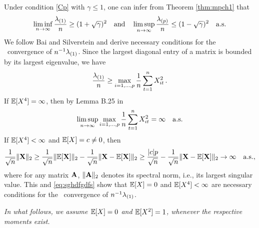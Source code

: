 Under condition \eqref{Cp} with $\gamma\le 1$, one can infer from Theorem \ref{thm:mpch1} that
\begin{equation}\label{eq:conlcu}
\liminf_{n\to \infty}\frac{\lambda_{(1)}}{n} \ge (1+\sqrt{\gamma})^2\quad \mbox{and}\quad
\limsup_{n\to \infty}\frac{\lambda_{(p)}}{n} \le (1-\sqrt{\gamma})^2\quad {\rm a.s.} 
\end{equation}
We follow Bai and Silverstein \cite{bai:silverstein:2010} and derive necessary conditions for the \as~convergence of $n^{-1}\lambda_{(1)}$. Since the largest diagonal entry of a matrix is bounded by its largest eigenvalue, we have
\begin{equation}\label{eq:simplebo}
\frac{\lambda_{(1)}}{n}\ge \max_{i=1,\ldots,p} \frac{1}{n} \sum_{t=1}^n X_{it}^2\,.
\end{equation}
If $\mathbb{E}[X^4]=\infty$, then by Lemma B.25 in \cite{bai:silverstein:2010}
\begin{equation}\label{eq:sghdfgdfs}
\limsup_{n\to \infty}\max_{i=1,\ldots,p} \frac{1}{n} \sum_{t=1}^n X_{it}^2 =\infty \quad {\rm a.s.}
\end{equation}
If $\mathbb{E}[X^4]<\infty$ and $\mathbb{E}[X]=c\neq 0$, then
\begin{equation*}
\frac{1}{\sqrt{n}}\|{\mathbf X}\|_2\ge \frac{1}{\sqrt{n}}\|\mathbb{E}[{\mathbf X}]\|_2  -\frac{1}{\sqrt{n}}\|{\mathbf X}-\mathbb{E}[{\mathbf X}]\|_2
\ge \frac{|c| p}{\sqrt{n}}  - \frac{1}{\sqrt{n}}\|{\mathbf X}-\mathbb{E}[{\mathbf X}]\|_2 \to\infty \quad {\rm a.s.},
\end{equation*}
where for any matrix ${\mathbf A}$, $\|{\mathbf A}\|_2$ denotes its spectral norm, i.e., its largest singular value. This and \eqref{eq:sghdfgdfs} show that $\mathbb{E}[X]=0$ and $\mathbb{E}[X^4]<\infty$ are necessary conditions for the \as~convergence of $n^{-1}\lambda_{(1)}$.

{\em In what follows, we assume $\mathbb{E}[X]=0$ and $\mathbb{E}[X^2]=1$, whenever the respective moments exist.}

